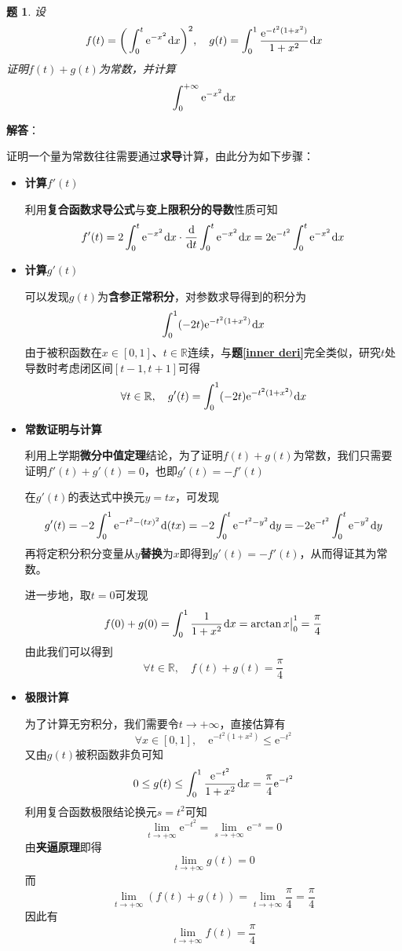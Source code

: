 \documentclass[a4paper,UTF8,fontset=windows,AutoFakeBold]{ctexart}
\newcommand*{\dr}{\hspace{0.07em}\mathrm{d}}
\newcommand*{\er}{\mathrm{e}}
\newcommand*{\rb}{\mathbb{R}}
\theoremstyle{ex}
\newtheorem{exercise}{题}
\newcommand{\exref}[1]{\textbf{题\;\ref{#1}\;}}
\newcommand{\sol}[1]{{\vspace{5pt}\kaishu\noindent\textbf{解答}：\vspace{-3pt}
\begin{compactitem}
    \item[] #1
\end{compactitem}
}}
\begin{document}
\begin{framed}
\begin{exercise}
    设
    $$f(t)=\bigg(\int_0^t\er^{-x^2}\dr x\bigg)^2,\quad g(t)=\int_0^1\frac{\er^{-t^2(1+x^2)}}{1+x^2}\dr x$$
    证明$f(t)+g(t)$为常数，并计算
    $$\int_0^{+\infty}\er^{-x^2}\dr x$$
\end{exercise}
\sol{
    证明一个量为常数往往需要通过\textbf{求导}计算，由此分为如下步骤：
    \begin{itemize}
        \item \textbf{计算$f'(t)$}
        
        利用\textbf{复合函数求导公式}与\textbf{变上限积分的导数}性质可知
        $$f'(t)=2\int_0^t\er^{-x^2}\dr x\cdot\frac{\dr}{\dr t}\int_0^t\er^{-x^2}\dr x=2\er^{-t^2}\int_0^t\er^{-x^2}\dr x$$
        
        \item \textbf{计算$g'(t)$}

        可以发现$g(t)$为\textbf{含参正常积分}，对参数求导得到的积分为
        $$\int_0^1(-2t)\er^{-t^2(1+x^2)}\dr x$$
        由于被积函数在$x\in[0,1]$、$t\in\rb$连续，与\exref{inner deri}完全类似，研究$t$处导数时考虑闭区间$[t-1,t+1]$可得
        $$\forall t\in\rb,\quad g'(t)=\int_0^1(-2t)\er^{-t^2(1+x^2)}\dr x$$

        \item \textbf{常数证明与计算}
        
        利用上学期\textbf{微分中值定理}结论，为了证明$f(t)+g(t)$为常数，我们只需要证明$f'(t)+g'(t)=0$，也即$g'(t)=-f'(t)$

        在$g'(t)$的表达式中换元$y=tx$，可发现
        $$g'(t)=-2\int_0^1\er^{-t^2-(tx)^2}\dr(tx)=-2\int_0^t\er^{-t^2-y^2}\dr y=-2\er^{-t^2}\int_0^t\er^{-y^2}\dr y$$
        再将定积分积分变量从$y$\textbf{替换}为$x$即得到$g'(t)=-f'(t)$，从而得证其为常数。

        进一步地，取$t=0$可发现
        $$f(0)+g(0)=\int_0^1\frac{1}{1+x^2}\dr x=\arctan x\big|^1_0=\frac{\pi}{4}$$
        由此我们可以得到
        $$\forall t\in\rb,\quad f(t)+g(t)=\frac{\pi}{4}$$
        
        \item \textbf{极限计算}

        为了计算无穷积分，我们需要令$t\to+\infty$，直接估算有
        $$\forall x\in[0,1],\quad\er^{-t^2(1+x^2)}\le\er^{-t^2}$$
        又由$g(t)$被积函数非负可知
        $$0\le g(t)\le\int_0^1\frac{\er^{-t^2}}{1+x^2}\dr x=\frac{\pi}{4}\er^{-t^2}$$
        利用复合函数极限结论换元$s=t^2$可知
        $$\lim_{t\to+\infty}\er^{-t^2}=\lim_{s\to+\infty}\er^{-s}=0$$
        由\textbf{夹逼原理}即得
        $$\lim_{t\to+\infty}g(t)=0$$
        而
        $$\lim_{t\to+\infty}(f(t)+g(t))=\lim_{t\to+\infty}\frac{\pi}{4}=\frac{\pi}{4}$$
        因此有
        $$\lim_{t\to+\infty}f(t)=\frac{\pi}{4}$$


\end{itemize}}
\end{framed}
\end{document}
